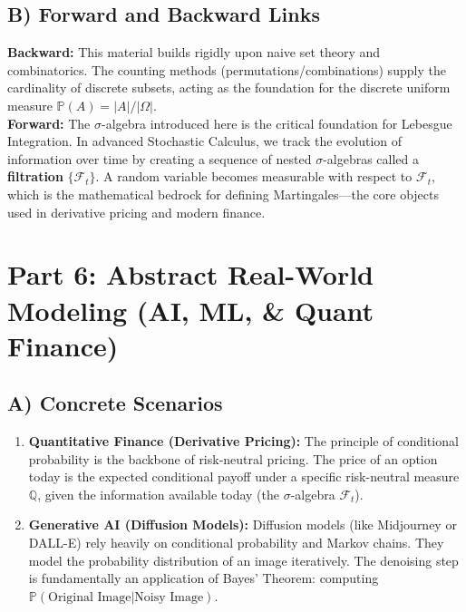\documentclass[11pt]{article}
\theoremstyle{definition}
\theoremstyle{remark}
\newcommand{\F}{\mathcal{F}}
\newcommand{\Prob}{\mathbb{P}}
\newcommand{\Q}{\mathbb{Q}}
\begin{document}
\subsection{B) Forward and Backward Links}
\textbf{Backward:} This material builds rigidly upon naive set theory and combinatorics. The counting methods (permutations/combinations) supply the cardinality of discrete subsets, acting as the foundation for the discrete uniform measure $\Prob(A) = |A|/|\Omega|$.\\
\textbf{Forward:} The $\sigma$-algebra introduced here is the critical foundation for Lebesgue Integration. In advanced Stochastic Calculus, we track the evolution of information over time by creating a sequence of nested $\sigma$-algebras called a \textbf{filtration} $\{\F_t\}$. A random variable becomes measurable with respect to $\F_t$, which is the mathematical bedrock for defining Martingales—the core objects used in derivative pricing and modern finance.

\section{Part 6: Abstract Real-World Modeling (AI, ML, \& Quant Finance)}

\subsection{A) Concrete Scenarios}
\begin{enumerate}
    \item \textbf{Quantitative Finance (Derivative Pricing):} The principle of conditional probability is the backbone of risk-neutral pricing. The price of an option today is the expected conditional payoff under a specific risk-neutral measure $\Q$, given the information available today (the $\sigma$-algebra $\F_t$).
    \item \textbf{Generative AI (Diffusion Models):} Diffusion models (like Midjourney or DALL-E) rely heavily on conditional probability and Markov chains. They model the probability distribution of an image iteratively. The denoising step is fundamentally an application of Bayes' Theorem: computing $\Prob(\text{Original Image} | \text{Noisy Image})$.
\end{enumerate}
\end{document}
